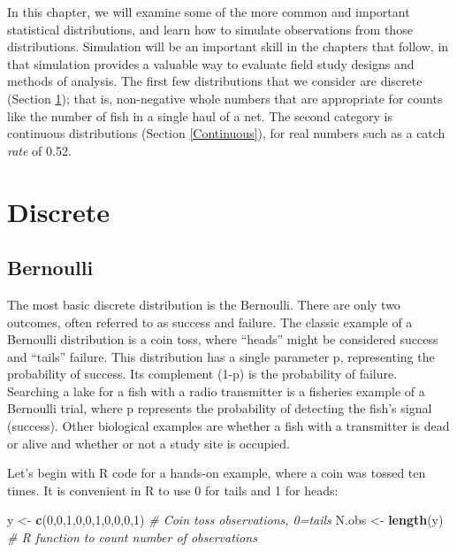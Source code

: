 \documentclass[
]{krantz}
\makeatletter
\newenvironment{Shaded}{\begin{snugshade}}{\end{snugshade}}
\newcommand{\CommentTok}[1]{\textcolor[rgb]{0.37,0.37,0.37}{\textit{#1}}}
\newcommand{\DecValTok}[1]{\textcolor[rgb]{0.06,0.06,0.06}{#1}}
\newcommand{\FunctionTok}[1]{\textcolor[rgb]{0.27,0.27,0.27}{\textbf{#1}}}
\newcommand{\NormalTok}[1]{#1}
\newcommand{\OtherTok}[1]{\textcolor[rgb]{0.37,0.37,0.37}{#1}}
\newenvironment{kframe}{%
\medskip{}
\setlength{\fboxsep}{.8em}
 \def\at@end@of@kframe{}%
 \ifinner\ifhmode%
  \def\at@end@of@kframe{\end{minipage}}%
  \begin{minipage}{\columnwidth}%
 \fi\fi%
 \def\FrameCommand##1{\hskip\@totalleftmargin \hskip-\fboxsep
 \colorbox{shadecolor}{##1}\hskip-\fboxsep
     \hskip-\linewidth \hskip-\@totalleftmargin \hskip\columnwidth}%
 \MakeFramed {\advance\hsize-\width
   \@totalleftmargin\z@ \linewidth\hsize
   \@setminipage}}%
 {\par\unskip\endMakeFramed%
 \at@end@of@kframe}
\renewenvironment{Shaded}{\begin{kframe}}{\end{kframe}}
\makeatother
\begin{document}
In this chapter, we will examine some of the more common and important statistical distributions, and learn how to simulate observations from those distributions. Simulation will be an important skill in the chapters that follow, in that simulation provides a valuable way to evaluate field study designs and methods of analysis. The first few distributions that we consider are discrete (Section \ref{Discrete}); that is, non-negative whole numbers that are appropriate for counts like the number of fish in a single haul of a net. The second category is continuous distributions (Section \ref{Continuous}), for real numbers such as a catch \emph{rate} of 0.52.

\hypertarget{Discrete}{%
\section{Discrete}\label{Discrete}}

\hypertarget{Bernoulli}{%
\subsection{Bernoulli}\label{Bernoulli}}

The most basic discrete distribution is the Bernoulli. There are only two outcomes, often referred to as success and failure. The classic example of a Bernoulli distribution is a coin toss, where ``heads'' might be considered success and ``tails'' failure. This distribution has a single parameter p, representing the probability of success. Its complement (1-p) is the probability of failure. Searching a lake for a fish with a radio transmitter is a fisheries example of a Bernoulli trial, where p represents the probability of detecting the fish's signal (success). Other biological examples are whether a fish with a transmitter is dead or alive and whether or not a study site is occupied.

Let's begin with R code for a hands-on example, where a coin was tossed ten times. It is convenient in R to use 0 for tails and 1 for heads:

\begin{Shaded}
\begin{Highlighting}[]
\NormalTok{y }\OtherTok{\textless{}{-}} \FunctionTok{c}\NormalTok{(}\DecValTok{0}\NormalTok{,}\DecValTok{0}\NormalTok{,}\DecValTok{1}\NormalTok{,}\DecValTok{0}\NormalTok{,}\DecValTok{0}\NormalTok{,}\DecValTok{1}\NormalTok{,}\DecValTok{0}\NormalTok{,}\DecValTok{0}\NormalTok{,}\DecValTok{0}\NormalTok{,}\DecValTok{1}\NormalTok{)  }\CommentTok{\# Coin toss observations, 0=tails}
\NormalTok{N.obs }\OtherTok{\textless{}{-}} \FunctionTok{length}\NormalTok{(y) }\CommentTok{\# R function to count number of observations}
\end{Highlighting}
\end{Shaded}
\end{document}
